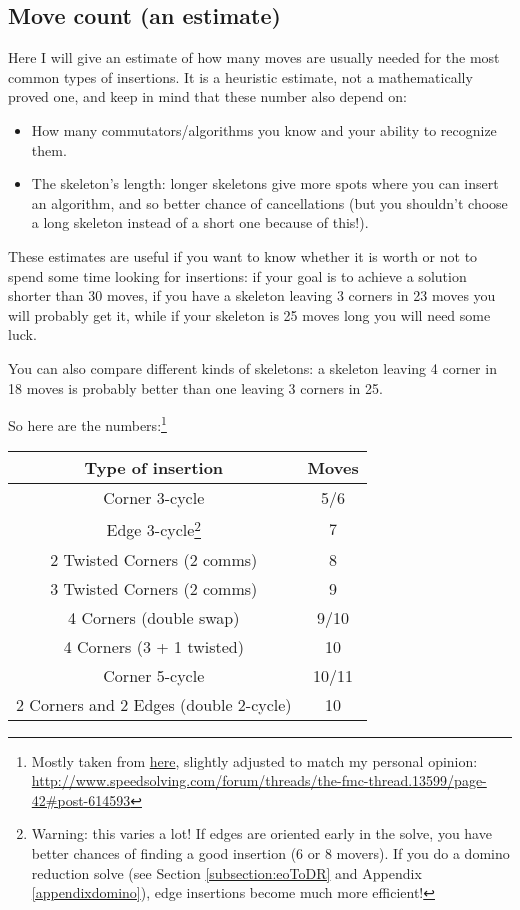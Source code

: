 \documentclass[11pt,a4paper]{book}
\begin{document}
\subsection{Move count (an estimate)}

Here I will give an estimate of how many moves are usually needed for the most common types of insertions. It is a heuristic estimate, not a mathematically proved one, and keep in mind that these number also depend on:
\begin{itemize}
\item How many commutators/algorithms you know and your ability to recognize them.
\item The skeleton's length: longer skeletons give more spots where you can insert an algorithm, and so better chance of cancellations (but you shouldn't choose a long skeleton instead of a short one because of this!).
\end{itemize}
These estimates are useful if you want to know whether it is worth or not to spend some time looking for insertions: if your goal is to achieve a solution shorter than 30 moves, if you have a skeleton leaving 3 corners in 23 moves you will probably get it, while if your skeleton is 25 moves long you will need some luck.

You can also compare different kinds of skeletons: a skeleton leaving 4 corner in 18 moves is probably better than one leaving 3 corners in 25.

So here are the numbers:\footnote{Mostly taken from \href{https://www.speedsolving.com/forum/threads/the-fmc-thread.13599/page-42\#post-614593}{here}, slightly adjusted to match my personal opinion: \url{http://www.speedsolving.com/forum/threads/the-fmc-thread.13599/page-42\#post-614593}}

\begin{center}
\begin{tabular}{|c|c|}
\hline
\textbf{Type of insertion} & \textbf{Moves}\\
\hline
Corner 3-cycle & 5/6\\
\hline
Edge 3-cycle\footnote{Warning: this varies a lot! If edges are oriented early in the solve, you have better chances of finding a good insertion (6 or 8 movers). If you do a domino reduction solve (see Section \ref{subsection:eoToDR} and Appendix \ref{appendixdomino}), edge insertions become much more efficient!} & 7\\
\hline
2 Twisted Corners (2 comms) & 8\\
\hline
3 Twisted Corners (2 comms) & 9\\
\hline
4 Corners (double swap) & 9/10\\
\hline
4 Corners (3 + 1 twisted) & 10\\
\hline
Corner 5-cycle & 10/11\\
\hline
2 Corners and 2 Edges (double 2-cycle) & 10\\
\hline
\end{tabular}
\end{center}
\end{document}
